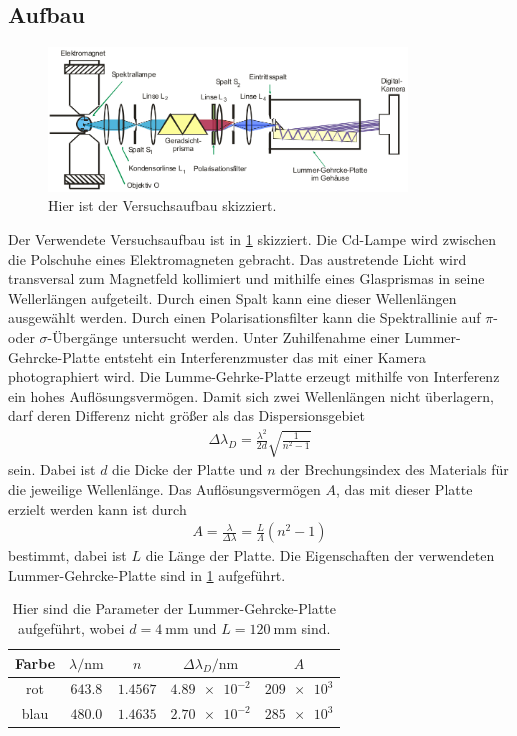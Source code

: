 \subsection{Aufbau}
\begin{figure}[h!]
		\centering
		\includegraphics[width = 0.85\textwidth]{../Grafiken/Aufbau.jpg}
		\caption{Hier ist der Versuchsaufbau skizziert. \cite{V27}\label{fig:Versuchsaufbau}}
\end{figure}
\noindent
Der Verwendete Versuchsaufbau ist in \cref{fig:Versuchsaufbau} skizziert.
Die Cd-Lampe wird zwischen die Polschuhe eines Elektromagneten gebracht.
Das austretende Licht wird transversal zum Magnetfeld kollimiert und mithilfe
eines Glasprismas in seine Wellerlängen aufgeteilt. Durch einen Spalt kann eine dieser Wellenlängen ausgewählt werden.
Durch einen Polarisationsfilter kann die Spektrallinie auf $\pi$- oder $\sigma$-Übergänge untersucht werden.
Unter Zuhilfenahme einer Lummer-Gehrcke-Platte entsteht ein Interferenzmuster das mit einer Kamera photographiert wird.
Die Lumme-Gehrke-Platte erzeugt mithilfe von Interferenz ein hohes Auflösungsvermögen.
Damit sich zwei Wellenlängen nicht überlagern, darf deren Differenz nicht größer als das Dispersionsgebiet
\begin{align}
	\Delta \lambda_D =\frac{\lambda^2}{2d}\sqrt{\frac{1}{n^2-1}}
\end{align}
sein.
Dabei ist $d$ die Dicke der Platte und $n$ der Brechungsindex des Materials für die jeweilige Wellenlänge.
Das Auflösungsvermögen $A$, das mit dieser Platte erzielt werden kann ist durch
\begin{align}
	A=\frac{\lambda}{\Delta\lambda}=\frac{L}{\Lambda}(n^2-1)
\end{align}
bestimmt, dabei ist $L$ die Länge der Platte.
Die Eigenschaften der verwendeten Lummer-Gehrcke-Platte sind in \cref{tab:Lummer-Gehrcke} aufgeführt.
\begin{table}[h!]
	\centering
	\begin{tabular}{ccccc}
		\toprule
		Farbe & $\lambda/\si{\nano\meter}$& $n$ & $\Delta\lambda_D/\si{\nano\meter}$& $A$\\\midrule
		rot & $\num{643,8}$ & $\num{1,4567}$ & $\num{4.89e-2}$ & $\num{209e3}$\\
		blau & $\num{480,0}$& $\num{1,4635}$ & $\num{2,70e-2}$ & $\num{285e3}$\\\bottomrule
	\end{tabular}
	\caption{Hier sind die Parameter der Lummer-Gehrcke-Platte aufgeführt, wobei $d=\SI{4}{\milli\meter}$ und $L=\SI{120}{\milli\meter}$ sind. \label{tab:Lummer-Gehrcke}}
\end{table}
\newpage
